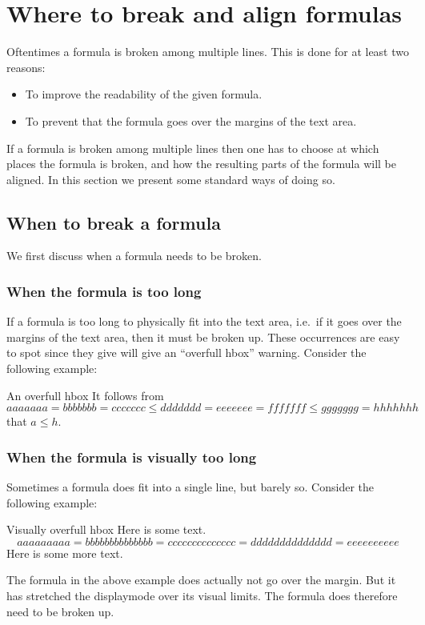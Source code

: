 \section{Where to break and align formulas}
\label{break and align ponts}

Oftentimes a formula is broken among multiple lines.
This is done for at least two reasons:
\begin{itemize}
  \item
    To improve the readability of the given formula.
  \item
    To prevent that the formula goes over the margins of the text area.
\end{itemize}
If a formula is broken among multiple lines then one has to choose at which places the formula is broken, and how the resulting parts of the formula will be aligned.
In this section we present some standard ways of doing so.



\subsection{When to break a formula}

We first discuss when a formula needs to be broken.

\subsubsection{When the formula is too long}

If a formula is too long to physically fit into the text area, i.e.\ if it goes over the margins of the text area, then it must be broken up.
These occurrences are easy to spot since they give will give an \enquote{overfull hbox} warning.
Consider the following example:
\begingroup
\begin{showlatex}[before lower = {\hfuzz = 40pt}, after lower = {\hfuzz = 0pt}]{An overfull hbox}
  It follows from
  \[
    aaaaaaa
    =
    bbbbbbb
    =
    ccccccc
    \leq
    ddddddd
    =
    eeeeeee
    =
    fffffff
    \leq
    ggggggg
    =
    hhhhhhh
  \]
  that $a \leq h$.
\end{showlatex}
\endgroup

\subsubsection{When the formula is visually too long}

Sometimes a formula does fit into a single line, but barely so.
Consider the following example:
\begin{showlatex}{Visually overfull hbox}
Here is some text.
\[
  aaaaaaaaa = bbbbbbbbbbbbbb = cccccccccccccc = dddddddddddddd = eeeeeeeeee
\]
Here is some more text.
\end{showlatex}
The formula in the above example does actually not go over the margin.
But it has stretched the displaymode over its visual limits.
The formula does therefore need to be broken up.

